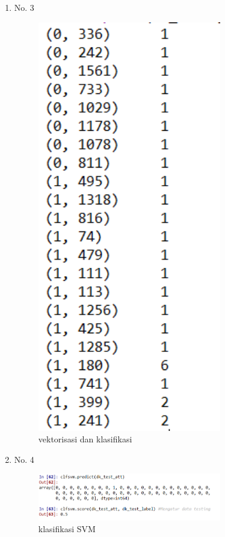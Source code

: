 \begin{enumerate}
\item No. 3
	\hfill\\
	
\begin{figure}[H]
    \includegraphics[width=8cm]{figures/1174084/4/3.png}
    \centering
    \caption{vektorisasi dan klasiﬁkasi}
\end{figure}

\item No. 4
	\hfill\\
	
\begin{figure}[H]
    \includegraphics[width=8cm]{figures/1174084/4/4.png}
    \centering
    \caption{klasiﬁkasi SVM}
\end{figure}


\end{enumerate}
